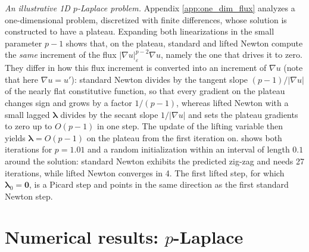 \documentclass[11pt,pdflatex,sn-mathphys-num]{sn-jnl}
\theoremstyle{thmstyleone}%
\theoremstyle{thmstyletwo}%
\theoremstyle{thmstylethree}%
\newcommand{\bs}[1]{\ensuremath{\boldsymbol{#1}}}
\begin{document}
\noindent
\emph{An illustrative 1D $p$-Laplace problem.}
Appendix \ref{app:one_dim_flux} analyzes a one-dimensional problem, discretized with finite differences, whose solution is constructed to have a plateau. Expanding both linearizations in the small parameter $p-1$ shows that, on the plateau, standard and lifted Newton compute the \emph{same} increment of the flux $|\nabla u|_\varepsilon^{p-2}\nabla u$, namely the one that drives it to zero. They differ in how this flux increment is converted into an increment of $\nabla u$ (note that here $\nabla u=u'$): standard Newton divides by the tangent slope $(p-1)/|\nabla u|$ of the nearly flat constitutive function, so that every gradient on the plateau changes sign and grows by a factor $1/(p-1)$, whereas lifted Newton with a small lagged $\bs\lambda$ divides by the secant slope $1/|\nabla u|$ and sets the plateau gradients to zero up to $O(p-1)$ in one step. The update of the lifting variable then yields $\bs\lambda=O(p-1)$ on the plateau from the first iteration on.  shows both iterations for $p=1.01$ and a random initialization within an interval of length $0.1$ around the solution: standard Newton exhibits the predicted zig-zag and needs 27 iterations, while lifted Newton converges in 4. The first lifted step, for which $\bs\lambda_0=\bs 0$, is a Picard step and points in the same direction as the first standard Newton step.




\section{Numerical results: $p$-Laplace}
\label{sec:numerics-p-laplace}
\end{document}
